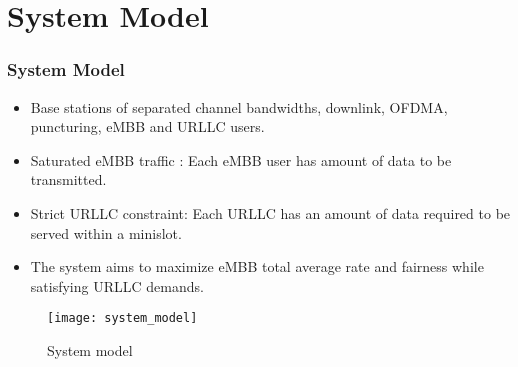 \section{System Model}
\begin{frame}
  \frametitle{System Model}
  \begin{itemize}
    \item Base stations of separated channel bandwidths, downlink, OFDMA, puncturing, eMBB and URLLC users.
    \item Saturated eMBB traffic \cite{S05}: Each eMBB user has  amount of data to be transmitted.
    \item Strict URLLC constraint: Each URLLC has an amount of data required to be served within a minislot.
    \item The system aims to maximize eMBB total average rate and fairness while satisfying URLLC demands.
  \end{itemize}
\end{frame}

\begin{frame}
  \begin{figure}
    \texttt{[image: system\_model]}
    \caption{System model}
  \end{figure}
\end{frame}

